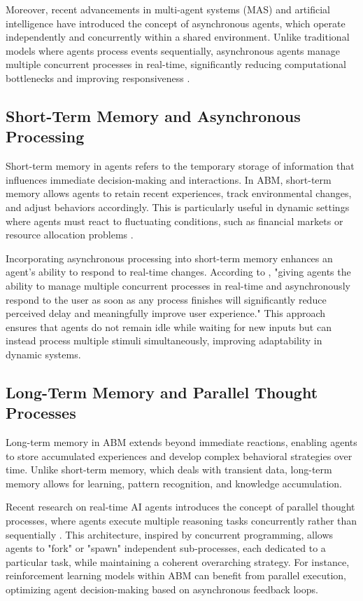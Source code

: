 Moreover, recent advancements in multi-agent systems (MAS) and artificial intelligence have introduced the concept of asynchronous agents, which operate independently and concurrently within a shared environment. Unlike traditional models where agents process events sequentially, asynchronous agents manage multiple concurrent processes in real-time, significantly reducing computational bottlenecks and improving responsiveness \cite{ginart2024}.

\subsection{Short-Term Memory and Asynchronous Processing}

Short-term memory in agents refers to the temporary storage of information that influences immediate decision-making and interactions. In ABM, short-term memory allows agents to retain recent experiences, track environmental changes, and adjust behaviors accordingly. This is particularly useful in dynamic settings where agents must react to fluctuating conditions, such as financial markets or resource allocation problems \cite{janssen2005}.

Incorporating asynchronous processing into short-term memory enhances an agent’s ability to respond to real-time changes. According to \cite{ginart2024}, "giving agents the ability to manage multiple concurrent processes in real-time and asynchronously respond to the user as soon as any process finishes will significantly reduce perceived delay and meaningfully improve user experience." This approach ensures that agents do not remain idle while waiting for new inputs but can instead process multiple stimuli simultaneously, improving adaptability in dynamic systems.

\subsection{Long-Term Memory and Parallel Thought Processes}

Long-term memory in ABM extends beyond immediate reactions, enabling agents to store accumulated experiences and develop complex behavioral strategies over time. Unlike short-term memory, which deals with transient data, long-term memory allows for learning, pattern recognition, and knowledge accumulation.

Recent research on real-time AI agents introduces the concept of parallel thought processes, where agents execute multiple reasoning tasks concurrently rather than sequentially \cite{ginart2024}. This architecture, inspired by concurrent programming, allows agents to "fork" or "spawn" independent sub-processes, each dedicated to a particular task, while maintaining a coherent overarching strategy. For instance, reinforcement learning models within ABM can benefit from parallel execution, optimizing agent decision-making based on asynchronous feedback loops.

